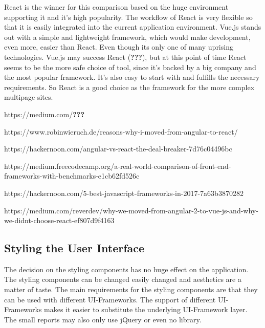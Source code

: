\documentclass[american,a4paper,oneside,,tablecaptionabove]{scrbook}
\begin{document}
React is the winner for this comparison based on the huge environment
supporting it and it's high popularity. The workflow of React is very
flexible so that it is easily integrated into the current application
environment. Vue.js stands out with a simple and lightweight framework,
which would make development, even more, easier than React. Even though
its only one of many uprising technologies. Vue.js may success React
({\textbf{???}}), but at this point of time React seems to be the more
safe choice of tool, since it's backed by a big company and the most
popular framework. It's also easy to start with and fulfills the
necessary requirements. So React is a good choice as the framework for
the more complex multipage sites.

https://medium.com/\textbf{???}

https://www.robinwieruch.de/reasons-why-i-moved-from-angular-to-react/

https://hackernoon.com/angular-vs-react-the-deal-breaker-7d76c04496bc

https://medium.freecodecamp.org/a-real-world-comparison-of-front-end-frameworks-with-benchmarks-e1cb62fd526c

https://hackernoon.com/5-best-javascript-frameworks-in-2017-7a63b3870282

https://medium.com/reverdev/why-we-moved-from-angular-2-to-vue-js-and-why-we-didnt-choose-react-ef807d9f4163

\subsection{Styling the User
Interface}\label{styling-the-user-interface}

The decision on the styling components has no huge effect on the
application. The styling components can be changed easily changed and
aesthetics are a matter of taste. The main requirements for the styling
components are that they can be used with different UI-Frameworks. The
support of different UI-Frameworks makes it easier to substitute the
underlying UI-Framework layer. The small reports may also only use
jQuery or even no library.
\end{document}
